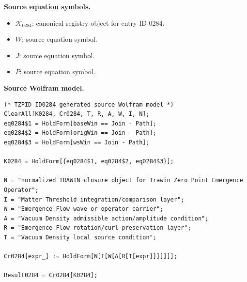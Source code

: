 \begin{minipage}[t]{0.49\linewidth}
\begingroup
\small
\raggedright
\textbf{Source equation symbols.}\par
\begin{itemize}[leftmargin=1.35em,itemsep=1pt,topsep=1pt,parsep=0pt]
    \item $\mathcal{K}_{0284}$: canonical registry object for entry ID 0284.
    \item $W$: source equation symbol.
    \item $J$: source equation symbol.
    \item $P$: source equation symbol.
\end{itemize}
\endgroup
\end{minipage}\hfill
\begin{minipage}[t]{0.47\linewidth}
\begingroup
\scriptsize
\raggedright
\textbf{Source Wolfram model.}\par
\begin{Verbatim}[fontsize=\tiny,breaklines=true,breakanywhere=true]
(* TZPID ID0284 generated source Wolfram model *)
ClearAll[K0284, Cr0284, T, R, A, W, I, N];
eq0284$1 = HoldForm[baseWin == Join - Path];
eq0284$2 = HoldForm[origWin == Join - Path];
eq0284$3 = HoldForm[wsWin == Join - Path];

K0284 = HoldForm[{eq0284$1, eq0284$2, eq0284$3}];

N = "normalized TRAWIN closure object for Trawin Zero Point Emergence Operator";
I = "Matter Threshold integration/comparison layer";
W = "Emergence Flow wave or operator carrier";
A = "Vacuum Density admissible action/amplitude condition";
R = "Emergence Flow rotation/curl preservation layer";
T = "Vacuum Density local source condition";

Cr0284[expr_] := HoldForm[N[I[W[A[R[T[expr]]]]]]];

Result0284 = Cr0284[K0284];
\end{Verbatim}
\endgroup
\end{minipage}

